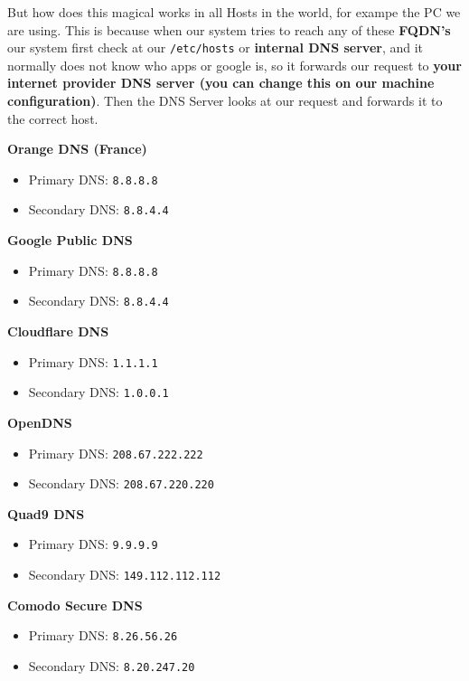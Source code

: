 \documentclass{article}
\begin{document}
But how does this magical works in all Hosts in the world, for exampe the PC we are using. This is because when our system tries to reach any of these \textbf{FQDN's} our system first check at our \verb|/etc/hosts| or \textbf{internal DNS server}, and it normally does not know who apps or google is, so it forwards our request to
\textbf{your internet provider DNS server (you can change this on our machine configuration)}. Then the DNS Server looks at our request and forwards it to the correct host.

\textbf{Orange DNS (France)}
\begin{itemize}
    \item Primary DNS: \texttt{8.8.8.8}
    \item Secondary DNS: \texttt{8.8.4.4}
\end{itemize}

\textbf{Google Public DNS}
\begin{itemize}
    \item Primary DNS: \texttt{8.8.8.8}
    \item Secondary DNS: \texttt{8.8.4.4}
\end{itemize}
    
\textbf{Cloudflare DNS}
\begin{itemize}
    \item Primary DNS: \texttt{1.1.1.1}
    \item Secondary DNS: \texttt{1.0.0.1}
\end{itemize}
    
\textbf{OpenDNS}
\begin{itemize}
    \item Primary DNS: \texttt{208.67.222.222}
    \item Secondary DNS: \texttt{208.67.220.220}
\end{itemize}
    
\textbf{Quad9 DNS}
\begin{itemize}
    \item Primary DNS: \texttt{9.9.9.9}
    \item Secondary DNS: \texttt{149.112.112.112}
\end{itemize}
    
\textbf{Comodo Secure DNS}
\begin{itemize}
    \item Primary DNS: \texttt{8.26.56.26}
    \item Secondary DNS: \texttt{8.20.247.20}
\end{itemize}
\end{document}
